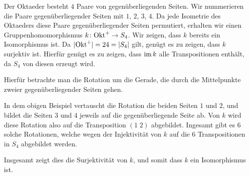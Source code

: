 Der Oktaeder besteht $4$ Paare von gegenüberliegenden Seiten.
Wir nummerieren die Paare gegenüberliegender Seiten mit $1$, $2$, $3$, $4$.
Da jede Isometrie des Oktaeders diese Paare gegenüberliegender Seiten permutiert, erhalten wir einen Gruppenhomomorphismus $k \colon \mathrm{Okt}^+ \to S_4$.
Wir zeigen, dass $k$ bereits ein Isomorphismus ist.
Da $|\mathrm{Okt}^+| = 24 = |S_4|$ gilt, genügt es zu zeigen, dass $k$ surjektiv ist.
Hierfür genügt es zu zeigen, dass $\operatorname{im} k$ alle Transpositionen enthält, da $S_4$ von diesen erzeugt wird.

Hierfür betrachte man die Rotation um die Gerade, die durch die Mittelpunkte zweier gegenüberliegender Seiten gehen.
\begin{center}
\end{center}
In dem obigen Beispiel vertauscht die Rotation die beiden Seiten $1$ und $2$, und bildet die Seiten $3$ und $4$ jeweils auf die gegenüberliegende Seite ab.
Von $k$ wird diese Rotation also auf die Transposition $(1 \; 2)$ abgebildet.
Ingesamt gibt es $6$ solche Rotationen, welche wegen der Injektivität von $k$ auf die $6$ Transpositionen in $S_4$ abgebildet werden.

Insgesamt zeigt dies die Surjektivität von $k$, und somit dass $k$ ein Isomorphismus ist.




